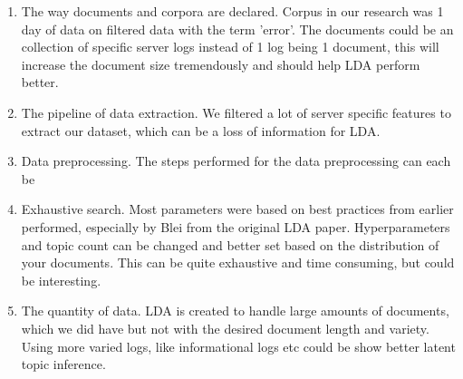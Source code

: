 \begin{enumerate}
    \item The way documents and corpora are declared. Corpus in our research was 1 day of data on filtered data with the term 'error'. The documents could be an collection of specific server logs instead of 1 log being 1 document, this will increase the document size tremendously and should help LDA perform better.
    \item The pipeline of data extraction. We filtered a lot of server specific features to extract our dataset, which can be a loss of information for LDA. 
    \item Data preprocessing. The steps performed for the data preprocessing can each be 
    \item Exhaustive search. Most parameters were based on best practices from earlier performed, especially by Blei from the original LDA paper. Hyperparameters and topic count can be changed and better set based on the distribution of your documents. This can be quite exhaustive and time consuming, but could be interesting.
    \item The quantity of data. LDA is created to handle large amounts of documents, which we did have but not with the desired document length and variety. Using more varied logs, like informational logs etc could be show better latent topic inference. 
\end{enumerate}
